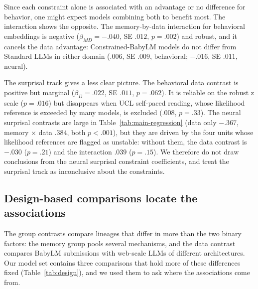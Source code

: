 Since each constraint alone is associated with an advantage or no difference for behavior, one might expect models combining both to benefit most. The interaction shows the opposite. The memory-by-data interaction for behavioral embeddings is negative ($\beta_{MD}=-.040$, SE $.012$, $p=.002$) and robust, and it cancels the data advantage: Constrained-BabyLM models do not differ from Standard LLMs in either domain ($.006$, SE $.009$, behavioral; $-.016$, SE $.011$, neural).

The surprisal track gives a less clear picture. The behavioral data contrast is positive but marginal ($\beta_D=.022$, SE $.011$, $p=.062$). It is reliable on the robust z scale ($p=.016$) but disappears when UCL self-paced reading, whose likelihood reference is exceeded by many models, is excluded ($.008$, $p=.33$). The neural surprisal contrasts are large in Table~\ref{tab:main-regression} (data only $-.367$, memory $\times$ data $.384$, both $p<.001$), but they are driven by the four units whose likelihood references are flagged as unstable: without them, the data contrast is $-.030$ ($p=.21$) and the interaction $.039$ ($p=.15$). We therefore do not draw conclusions from the neural surprisal constraint coefficients, and treat the surprisal track as inconclusive about the constraints.

\subsection{Design-based comparisons locate the associations}
\label{sec:results-design}



The group contrasts compare lineages that differ in more than the two binary factors: the memory group pools several mechanisms, and the data contrast compares BabyLM submissions with web-scale LLMs of different architectures. Our model set contains three comparisons that hold more of these differences fixed (Table~\ref{tab:design}), and we used them to ask where the associations come from.


